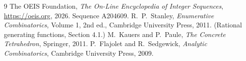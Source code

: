 \documentclass[11pt,a4paper]{article}
\theoremstyle{plain}
\theoremstyle{definition}
\begin{document}
\begin{thebibliography}{9}
 The OEIS Foundation, \emph{The On-Line Encyclopedia of Integer
Sequences}, \url{https://oeis.org}, 2026. Sequence A204609.
 R.~P.~Stanley, \emph{Enumerative Combinatorics}, Volume 1, 2nd ed.,
Cambridge University Press, 2011. (Rational generating functions, Section 4.1.)
 M.~Kauers and P.~Paule, \emph{The Concrete Tetrahedron}, Springer, 2011.
 P.~Flajolet and R.~Sedgewick, \emph{Analytic Combinatorics}, Cambridge
University Press, 2009.
\end{thebibliography}
\end{document}
